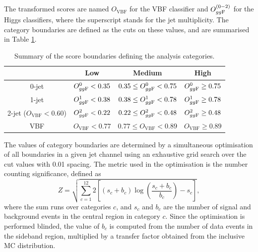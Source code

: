 The transformed scores are named $O_\text{VBF}$ for the VBF classifier
and $O_{gg\text{F}}^{(0-2)}$ for the Higgs classifiers, where the superscript
stands for the jet multiplicity. The category boundaries are defined
as the cuts on these values, and are summarised in Table \ref{tab:hmumu:categories}.
\begin{table}[h]
\centering
\caption{Summary of the score boundaries defining the analysis categories.}
\label{tab:hmumu:categories}
\begin{tabular}{c c c c}
\toprule
\midrule
                              & Low                   &  Medium                           &    High                  \\ 
\midrule
0-jet                         & $O^0_{gg\text{F}} < 0.35$   &  $0.35 \leq O^0_{gg\text{F}} < 0.75$    & $O^0_{gg\text{F}} \geq 0.75$   \\
1-jet                         & $O^1_{gg\text{F}} < 0.38$   &  $0.38 \leq O^1_{gg\text{F}} < 0.78$    & $O^1_{gg\text{F}} \geq 0.78$   \\
2-jet ($O_\text{VBF} < 0.60$) & $O^2_{gg\text{F}} < 0.22$   &  $0.22 \leq O^2_{gg\text{F}} < 0.48$    & $O^2_{gg\text{F}} \geq 0.48$   \\
VBF                           & $O_\text{VBF} < 0.77$ &  $0.77 \leq O_\text{VBF} < 0.89$  & $O_\text{VBF} \geq 0.89$ \\
\midrule
\bottomrule
\end{tabular}
\end{table}

The values of category boundaries are determined by a simultaneous
optimisation of all boundaries in a given jet channel using an exhaustive
grid search over the cut values with 0.01 spacing. The metric used in the
optimisation is the number counting significance, defined as
\begin{equation}
Z = \sqrt{\sum_{c=1}^{12} 2 \left[ (s_c + b_c) \log \left( \frac{s_c+b_c}{b_c}\right) - s_c \right]},
\end{equation}
where the sum runs over categories $c$, and $s_c$ and $b_c$ are the
number of signal and background events in the central region in category
$c$. Since the optimisation is performed blinded, the value of $b_c$ is
computed from the number of data events in the sideband region, multiplied
by a transfer factor obtained from the inclusive MC distribution.

